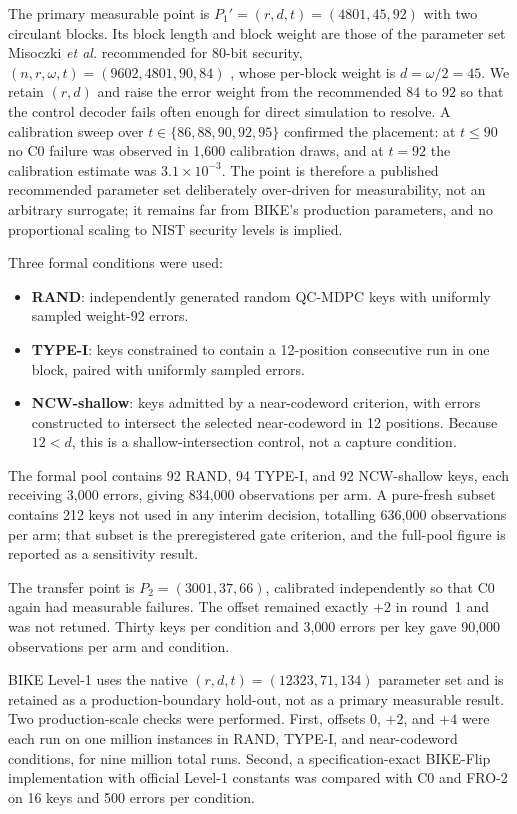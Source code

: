 \documentclass[lettersize,journal]{IEEEtran}
\begin{document}
The primary measurable point is $P_1'=(r,d,t)=(4801,45,92)$ with two circulant blocks. Its block length and block weight are those of the parameter set Misoczki \emph{et al.} recommended for 80-bit security, $(n,r,\omega,t)=(9602,4801,90,84)$ \cite{misoczki2013mdpc}, whose per-block weight is $d=\omega/2=45$. We retain $(r,d)$ and raise the error weight from the recommended $84$ to $92$ so that the control decoder fails often enough for direct simulation to resolve. A calibration sweep over $t\in\{86,88,90,92,95\}$ confirmed the placement: at $t\le90$ no C0 failure was observed in 1{,}600 calibration draws, and at $t=92$ the calibration estimate was $3.1\times10^{-3}$. The point is therefore a published recommended parameter set deliberately over-driven for measurability, not an arbitrary surrogate; it remains far from BIKE's production parameters, and no proportional scaling to NIST security levels is implied.

Three formal conditions were used:

\begin{itemize}[leftmargin=1.3em,itemsep=0.12em,topsep=0.2em]
\item \textbf{RAND}: independently generated random QC-MDPC keys with uniformly sampled weight-92 errors.
\item \textbf{TYPE-I}: keys constrained to contain a 12-position consecutive run in one block, paired with uniformly sampled errors.
\item \textbf{NCW-shallow}: keys admitted by a near-codeword criterion, with errors constructed to intersect the selected near-codeword in 12 positions. Because $12<d$, this is a shallow-intersection control, not a capture condition.
\end{itemize}

The formal pool contains 92 RAND, 94 TYPE-I, and 92 NCW-shallow keys, each receiving 3{,}000 errors, giving 834{,}000 observations per arm. A pure-fresh subset contains 212 keys not used in any interim decision, totalling 636{,}000 observations per arm; that subset is the preregistered gate criterion, and the full-pool figure is reported as a sensitivity result.

The transfer point is $P_2=(3001,37,66)$, calibrated independently so that C0 again had measurable failures. The offset remained exactly $+2$ in round~1 and was not retuned. Thirty keys per condition and 3{,}000 errors per key gave 90{,}000 observations per arm and condition.

BIKE Level-1 uses the native $(r,d,t)=(12323,71,134)$ parameter set and is retained as a production-boundary hold-out, not as a primary measurable result. Two production-scale checks were performed. First, offsets $0$, $+2$, and $+4$ were each run on one million instances in RAND, TYPE-I, and near-codeword conditions, for nine million total runs. Second, a specification-exact BIKE-Flip implementation with official Level-1 constants was compared with C0 and FRO-2 on 16 keys and 500 errors per condition.
\end{document}
